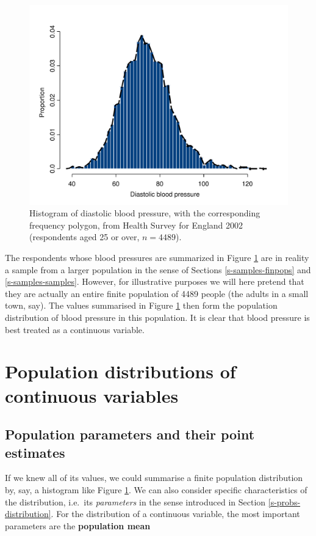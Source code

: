 \documentclass[11pt,a4paper,openany]{book}
\begin{document}
\begin{figure}[htbp]
\centering
\includegraphics[width=13.50000cm]{bloodp1.pdf}
\caption{\label{fig:f-bp1} Histogram of diastolic blood pressure, with the
corresponding frequency polygon, from Health Survey for England 2002
(respondents aged 25 or over, \(n=4489\)).}
\end{figure}

The respondents whose blood pressures are summarized in Figure
\ref{fig:f-bp1} are in reality a sample from a larger population in the
sense of Sections \ref{s-samples-finpops} and \ref{s-samples-samples}.
However, for illustrative purposes we will here pretend that they are
actually an entire finite population of 4489 people (the adults in a
small town, say). The values summarised in Figure \ref{fig:f-bp1} then
form the population distribution of blood pressure in this population.
It is clear that blood pressure is best treated as a continuous
variable.

\section{Population distributions of continuous
variables}\label{s-contd-popdistrs}

\subsection{Population parameters and their point
estimates}\label{ss-contd-popdistrs-params}

If we knew all of its values, we could summarise a finite population
distribution by, say, a histogram like Figure \ref{fig:f-bp1}. We can
also consider specific characteristics of the distribution, i.e.~its
\emph{parameters} in the sense introduced in Section
\ref{s-probs-distribution}. For the distribution of a continuous
variable, the most important parameters are the \textbf{population mean}
\end{document}
